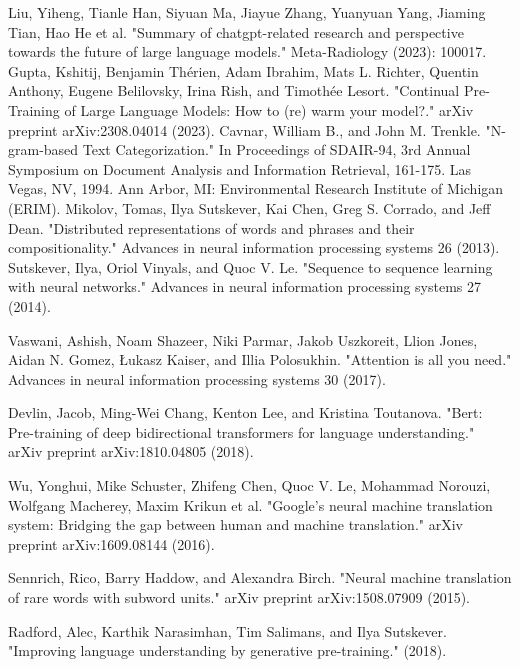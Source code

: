 \documentclass[t]{beamer}
\begin{document}
\begin{frame}[allowframebreaks]
  \begin{thebibliography}{}
    Liu, Yiheng, Tianle Han, Siyuan Ma, Jiayue Zhang, Yuanyuan Yang, Jiaming Tian, Hao He et al. "Summary of chatgpt-related research and perspective towards the future of large language models." Meta-Radiology (2023): 100017.
    Gupta, Kshitij, Benjamin Thérien, Adam Ibrahim, Mats L. Richter, Quentin Anthony, Eugene Belilovsky, Irina Rish, and Timothée Lesort. "Continual Pre-Training of Large Language Models: How to (re) warm your model?." arXiv preprint arXiv:2308.04014 (2023).  
    Cavnar, William B., and John M. Trenkle. "N-gram-based Text Categorization." In Proceedings of SDAIR-94, 3rd Annual Symposium on Document Analysis and Information Retrieval, 161-175. Las Vegas, NV, 1994. Ann Arbor, MI: Environmental Research Institute of Michigan (ERIM).
    Mikolov, Tomas, Ilya Sutskever, Kai Chen, Greg S. Corrado, and Jeff Dean. "Distributed representations of words and phrases and their compositionality." Advances in neural information processing systems 26 (2013).
Sutskever, Ilya, Oriol Vinyals, and Quoc V. Le. "Sequence to sequence learning with neural networks." Advances in neural information processing systems 27 (2014).

Vaswani, Ashish, Noam Shazeer, Niki Parmar, Jakob Uszkoreit, Llion Jones, Aidan N. Gomez, Łukasz Kaiser, and Illia Polosukhin. "Attention is all you need." Advances in neural information processing systems 30 (2017).

Devlin, Jacob, Ming-Wei Chang, Kenton Lee, and Kristina Toutanova. "Bert: Pre-training of deep bidirectional transformers for language understanding." arXiv preprint arXiv:1810.04805 (2018).

Wu, Yonghui, Mike Schuster, Zhifeng Chen, Quoc V. Le, Mohammad Norouzi, Wolfgang Macherey, Maxim Krikun et al. "Google's neural machine translation system: Bridging the gap between human and machine translation." arXiv preprint arXiv:1609.08144 (2016).
  
Sennrich, Rico, Barry Haddow, and Alexandra Birch. "Neural machine translation of rare words with subword units." arXiv preprint arXiv:1508.07909 (2015).

Radford, Alec, Karthik Narasimhan, Tim Salimans, and Ilya Sutskever. "Improving language understanding by generative pre-training." (2018).


\end{thebibliography}
\end{frame}
\end{document}
